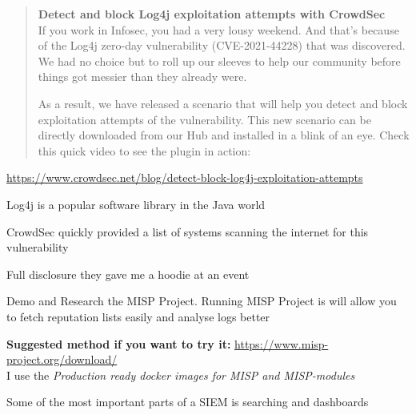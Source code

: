 \documentclass[Screen16to9,17pt]{foils}
\begin{document}

\begin{quote}
{\bf Detect and block Log4j exploitation attempts with CrowdSec}\\
If you work in Infosec, you had a very lousy weekend. And that’s because of the Log4j zero-day vulnerability (CVE-2021-44228) that was discovered. We had no choice but to roll up our sleeves to help our community before things got messier than they already were.

As a result, we have released a scenario that will help you detect and block exploitation attempts of the vulnerability. This new scenario can be directly downloaded from our Hub and installed in a blink of an eye. Check this quick video to see the plugin in action:
\end{quote}

\url{https://www.crowdsec.net/blog/detect-block-log4j-exploitation-attempts}


\begin{list2}
\item Log4j is a popular software library in the Java world
\item CrowdSec quickly provided a list of systems scanning the internet for this vulnerability
\item Full disclosure they gave me a hoodie at an event \smiley
\end{list2}






Demo and Research the MISP Project. Running MISP Project is  will allow you to fetch reputation lists easily and analyse logs better

{\bf Suggested method if you want to try it:} \url{https://www.misp-project.org/download/}\\
I use the \emph{Production ready docker images for MISP and MISP-modules }




\begin{list2}
\item Some of the most important parts of a SIEM is searching and dashboards
\end{list2}
\end{document}

